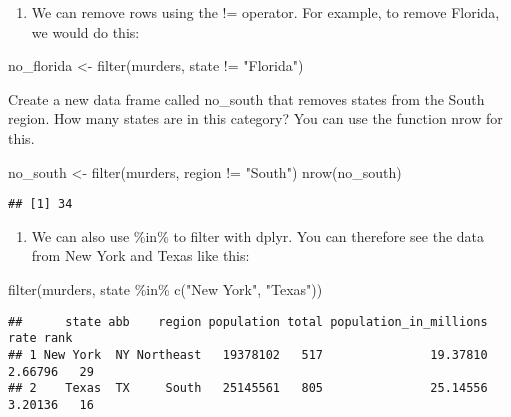 \documentclass[
]{article}
\newenvironment{Shaded}{\begin{snugshade}}{\end{snugshade}}
\newcommand{\FunctionTok}[1]{\textcolor[rgb]{0.00,0.00,0.00}{#1}}
\newcommand{\NormalTok}[1]{#1}
\newcommand{\OtherTok}[1]{\textcolor[rgb]{0.56,0.35,0.01}{#1}}
\newcommand{\SpecialCharTok}[1]{\textcolor[rgb]{0.00,0.00,0.00}{#1}}
\newcommand{\StringTok}[1]{\textcolor[rgb]{0.31,0.60,0.02}{#1}}
\providecommand{\tightlist}{%
  \setlength{\itemsep}{0pt}\setlength{\parskip}{0pt}}
\begin{document}
\begin{enumerate}
\def\labelenumi{\arabic{enumi}.}
\setcounter{enumi}{4}
\tightlist
\item
  We can remove rows using the != operator. For example, to remove
  Florida, we would do this:
\end{enumerate}

\begin{Shaded}
\begin{Highlighting}[]
\NormalTok{no\_florida }\OtherTok{\textless{}{-}} \FunctionTok{filter}\NormalTok{(murders, state }\SpecialCharTok{!=} \StringTok{"Florida"}\NormalTok{)}
\end{Highlighting}
\end{Shaded}

Create a new data frame called no\_south that removes states from the
South region. How many states are in this category? You can use the
function nrow for this.

\begin{Shaded}
\begin{Highlighting}[]
\NormalTok{no\_south }\OtherTok{\textless{}{-}} \FunctionTok{filter}\NormalTok{(murders, region }\SpecialCharTok{!=} \StringTok{"South"}\NormalTok{)}
\FunctionTok{nrow}\NormalTok{(no\_south)}
\end{Highlighting}
\end{Shaded}

\begin{verbatim}
## [1] 34
\end{verbatim}

\begin{enumerate}
\def\labelenumi{\arabic{enumi}.}
\setcounter{enumi}{5}
\tightlist
\item
  We can also use \%in\% to filter with dplyr. You can therefore see the
  data from New York and Texas like this:
\end{enumerate}

\begin{Shaded}
\begin{Highlighting}[]
\FunctionTok{filter}\NormalTok{(murders, state }\SpecialCharTok{\%in\%} \FunctionTok{c}\NormalTok{(}\StringTok{"New York"}\NormalTok{, }\StringTok{"Texas"}\NormalTok{))}
\end{Highlighting}
\end{Shaded}

\begin{verbatim}
##      state abb    region population total population_in_millions    rate rank
## 1 New York  NY Northeast   19378102   517               19.37810 2.66796   29
## 2    Texas  TX     South   25145561   805               25.14556 3.20136   16
\end{verbatim}
\end{document}

